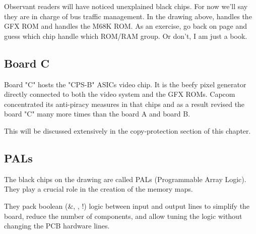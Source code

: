 
Observant readers will have noticed unexplained black chips. For now we'll say they are in charge of bus traffic management. In the drawing above,  handles the GFX ROM and  handles the M68K ROM. As an exercise, go back on page \pageref{fig:drawboarda} and guess which chip handle which ROM/RAM group. Or don't, I am just a book.



\subsection{Board C}
Board "C" hosts the "CPS-B" ASICs video chip. It is the beefy pixel generator directly connected to both the video system and the GFX ROMs. Capcom concentrated its anti-piracy measures in that chips and as a result revised the board "C" many more times than the board A and board B. 

This will be discussed extensively in the copy-protection section of this chapter.


\begin{minipage}[t]{0.49\linewidth}
\end{minipage}%
\hfill%
\begin{minipage}[t]{0.49\linewidth}
\end{minipage}



\subsection{PALs}
The black chips on the drawing are called PALs (Programmable Array Logic). They play a crucial role in the creation of the memory maps. 

They pack boolean (\&, \textbar, !) logic between input and output lines to simplify the board, 
reduce the number of components, and allow tuning the logic without changing the PCB hardware lines.


